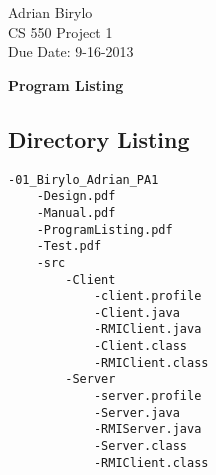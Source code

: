\documentclass{article}
\begin{document}
\begin{flushright}
Adrian Birylo\\
CS 550 Project 1\\
Due Date: 9-16-2013\\
\end{flushright}

\begin{center}
\textbf{\huge{Program Listing}}
\end{center}


\subsection*{Directory Listing}

\begin{lstlisting}
-01_Birylo_Adrian_PA1
 	-Design.pdf
 	-Manual.pdf
 	-ProgramListing.pdf
 	-Test.pdf
 	-src
 		-Client
 			-client.profile
 			-Client.java
	 		-RMIClient.java
 			-Client.class
 			-RMIClient.class
 		-Server
 			-server.profile
 			-Server.java
 			-RMIServer.java
 			-Server.class
 			-RMIClient.class

\end{lstlisting}
\end{document}
